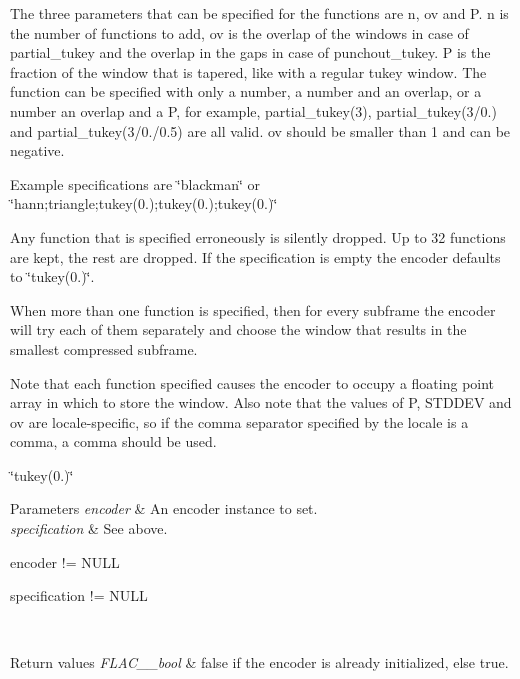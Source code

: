 The three parameters that can be specified for the functions are n, ov and P. n is the number of functions to add, ov is the overlap of the windows in case of partial\+\_\+tukey and the overlap in the gaps in case of punchout\+\_\+tukey. P is the fraction of the window that is tapered, like with a regular tukey window. The function can be specified with only a number, a number and an overlap, or a number an overlap and a P, for example, partial\+\_\+tukey(3), partial\+\_\+tukey(3/0.) and partial\+\_\+tukey(3/0./0.5) are all valid. ov should be smaller than 1 and can be negative.

Example specifications are {\ttfamily \char`\"{}blackman\char`\"{}} or {\ttfamily \char`\"{}hann;triangle;tukey(0.);tukey(0.);tukey(0.)\char`\"{}} 

Any function that is specified erroneously is silently dropped. Up to 32 functions are kept, the rest are dropped. If the specification is empty the encoder defaults to {\ttfamily \char`\"{}tukey(0.)\char`\"{}}.

When more than one function is specified, then for every subframe the encoder will try each of them separately and choose the window that results in the smallest compressed subframe.

Note that each function specified causes the encoder to occupy a floating point array in which to store the window. Also note that the values of P, S\+T\+D\+D\+EV and ov are locale-\/specific, so if the comma separator specified by the locale is a comma, a comma should be used.

{\ttfamily \char`\"{}tukey(0.)\char`\"{}} 
\begin{DoxyParams}{Parameters}
{\em encoder} & An encoder instance to set. \\
\hline
{\em specification} & See above.  
\begin{DoxyCode}
encoder != NULL 
\end{DoxyCode}
 
\begin{DoxyCode}
specification != NULL 
\end{DoxyCode}
 \\
\hline
\end{DoxyParams}

\begin{DoxyRetVals}{Return values}
{\em F\+L\+A\+C\+\_\+\+\_\+bool} & {\ttfamily false} if the encoder is already initialized, else {\ttfamily true}. \\
\hline
\end{DoxyRetVals}
\mbox{\label{group__flac__stream__encoder_ga5a21cf7f86a81df6ba72714a6b917aa3}} 
